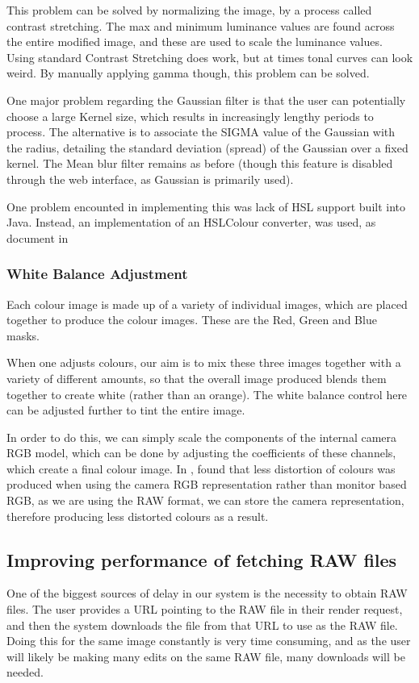 \documentclass[10pt,a4paper]{article}
\begin{document}
    This problem can be solved by normalizing the image, by a process called contrast stretching. The max and minimum luminance values are found across the
    entire modified image, and these are used to scale the luminance values. Using standard Contrast Stretching does work, but at times tonal curves can look weird. By manually applying gamma though, this problem can be
    solved.

    One major problem regarding the Gaussian filter is that the user can potentially choose a large Kernel size, which results in increasingly lengthy
    periods to process. The alternative is to associate the SIGMA value of the Gaussian with the radius, detailing the standard deviation (spread) of the
    Gaussian over a fixed kernel. The Mean blur filter remains as before (though this feature is disabled through the web interface, as Gaussian is
    primarily used).

    One problem encounted in implementing this was lack of HSL support built into Java. Instead, an implementation of an HSLColour converter, was used,
    as document in \cite{HSLImplementation}
\subsubsection{White Balance Adjustment}
    Each colour image is made up of a variety of individual images, which are placed together
    to produce the colour images. These are the Red, Green and Blue masks.

    When one adjusts colours, our aim is to mix these three images together with a variety of different
    amounts, so that the overall image produced blends them together to create white (rather than an orange).
    The white balance control here can be adjusted further to tint the entire image.

    In order to do this, we can simply scale the components of the internal camera RGB model, which can be done
    by adjusting the coefficients of these channels, which create a final colour image. In \cite{WhiteBalance}, \citeauthor{WhiteBalance}
    found that less distortion of colours was produced when using the camera RGB representation rather than monitor based
    RGB, as we are using the RAW format, we can store the camera representation, therefore producing less distorted colours
    as a result.


\subsection{Improving performance of fetching RAW files}\label{LocalImageCaching}
One of the biggest sources of delay in our system is the necessity to obtain RAW files. The user
provides a URL pointing to the RAW file in their render request, and then the system downloads the file
from that URL to use as the RAW file. Doing this for the same image constantly is very time consuming, and
as the user will likely be making many edits on the same RAW file, many downloads will be needed.
\end{document}
